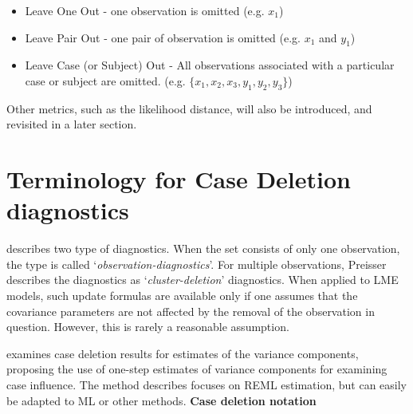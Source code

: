 \documentclass[12pt, a4paper]{report}
\theoremstyle{plain}
\theoremstyle{definition}
\theoremstyle{remark}
\begin{document}
\begin{itemize}
	\item Leave One Out - one observation is omitted (e.g. $x_1$)
	\item Leave Pair Out - one pair of observation  is omitted (e.g. $x_1$ and $y_1$)
	\item Leave Case (or Subject) Out - All observations associated with a particular case or subject are omitted. (e.g. $\{x_1,x_2,x_3,y_1,y_2,y_3\}$)
\end{itemize}
Other metrics, such as the likelihood distance, will also be introduced, and revisited in a later section.



%
%

\section{Terminology for Case Deletion diagnostics} %

\citet{preisser} describes two type of diagnostics. When the set consists of only one observation, the type is called
`\textit{observation-diagnostics}'. For multiple observations, Preisser describes the diagnostics as `\textit{cluster-deletion}' diagnostics. When applied to LME models, such update formulas are available only if one assumes that the covariance parameters are not affected by the removal of the observation in question. However, this is rarely a reasonable assumption.

\citet{Christensen}examines case deletion results for estimates of
the variance components, proposing the use of one-step estimates
of variance components for examining case influence. The method
describes focuses on REML estimation, but can easily be adapted to
ML or other methods.
\noindent \textbf{Case deletion notation} %
\end{document}
